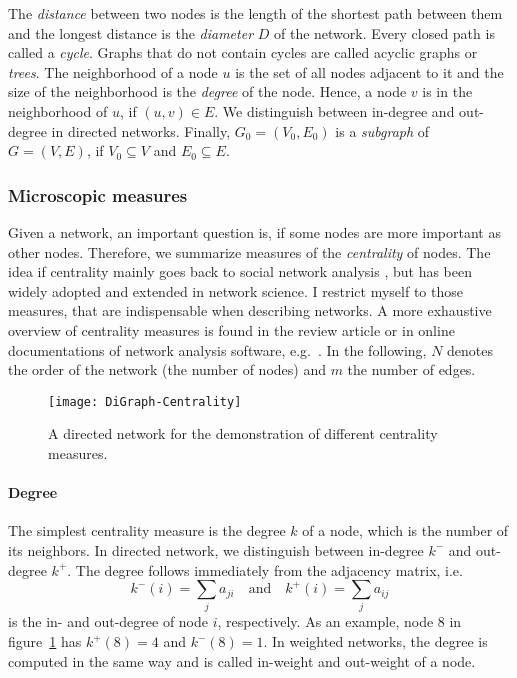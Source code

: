 The \emph{distance} between two nodes is the length of the shortest path between them and the longest distance is the \emph{diameter} $D$ of the network.
Every closed path is called a \emph{cycle}.
Graphs that do not contain cycles are called acyclic graphs or \emph{trees}.
The neighborhood of a node $u$ is the set of all nodes adjacent to it and the size of the neighborhood is the \emph{degree} of the node.
Hence, a node $v$ is in the neighborhood of $u$, if $(u,v) \in E$.
We distinguish between in-degree and out-degree in directed networks.
Finally, $G_0=(V_0,E_0)$ is a \emph{subgraph} of $G=(V,E)$, if $V_0 \subseteq V$ and $E_0 \subseteq E$.


\subsubsection{Microscopic measures}\label{sec:micro_measures}
Given a network, an important question is, if some nodes are more important as other nodes.
Therefore, we summarize measures of the \emph{centrality} of nodes.
The idea if centrality mainly goes back to social network analysis \citep{WassermanFaust,Freeman}, but has been widely adopted and extended in network science.
I restrict myself to those measures, that are indispensable when describing networks.
A more exhaustive overview of centrality measures is found in the review article \citep{MartinezLopez2009} or in online documentations of network analysis software, e.g.~\citep{hagberg2008,networkx:}.
In the following, $N$ denotes the order of the network (the number of nodes) and $m$ the number of edges.
%
\begin{figure}[htb]
\begin{center}
\texttt{[image: DiGraph-Centrality]}
\caption{A directed network for the demonstration of different centrality measures.}
\label{fig:example_net}
\end{center}
\end{figure}
%

\paragraph{Degree\color{Cayenne}{.}}
The simplest centrality measure is the degree $k$ of a node, which is the number of its neighbors.
In directed network, we distinguish between in-degree $k^-$ and out-degree $k^+$.
The degree follows immediately from the adjacency matrix, i.e.
\[
k ^-(i) = \sum _j a_{ji} \quad \text{and} \quad k ^+ (i)= \sum _j a_{ij}
\]
is the in- and out-degree of node $i$, respectively.
As an example, node $8$ in figure~\ref{fig:example_net} has $k ^+(8)=4$ and $k ^- (8)=1$.
In weighted networks, the degree is computed in the same way and is called in-weight and out-weight of a node.

